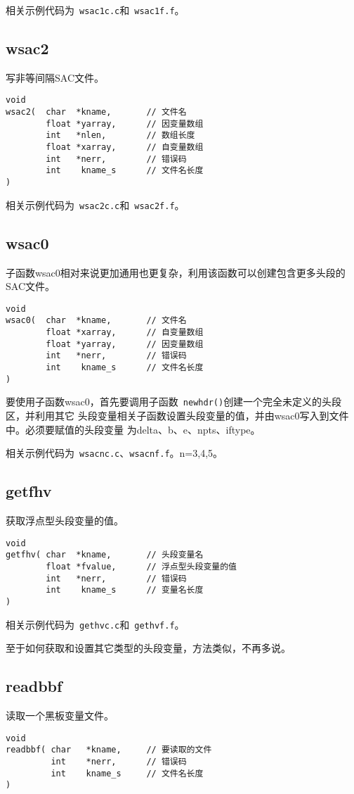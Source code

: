 相关示例代码为~\verb+wsac1c.c+和~\verb+wsac1f.f+。

\subsection{wsac2}
写非等间隔SAC文件。

\begin{verbatim}
void
wsac2(  char  *kname,       // 文件名
        float *yarray,      // 因变量数组
        int   *nlen,        // 数组长度
        float *xarray,      // 自变量数组
        int   *nerr,        // 错误码
        int    kname_s      // 文件名长度
)
\end{verbatim}

相关示例代码为~\verb+wsac2c.c+和~\verb+wsac2f.f+。

\subsection{wsac0}
子函数wsac0相对来说更加通用也更复杂，利用该函数可以创建包含更多头段的SAC文件。

\begin{verbatim}
void
wsac0(  char  *kname,       // 文件名
        float *xarray,      // 自变量数组
        float *yarray,      // 因变量数组
        int   *nerr,        // 错误码
        int    kname_s      // 文件名长度
)
\end{verbatim}

要使用子函数wsac0，首先要调用子函数~\verb+newhdr()+创建一个完全未定义的头段区，并利用其它
头段变量相关子函数设置头段变量的值，并由wsac0写入到文件中。必须要赋值的头段变量
为delta、b、e、npts、iftype。

相关示例代码为~\verb+wsacnc.c+、\verb+wsacnf.f+。n=3,4,5。

\subsection{getfhv}
获取浮点型头段变量的值。
\begin{verbatim}
void
getfhv( char  *kname,       // 头段变量名
        float *fvalue,      // 浮点型头段变量的值
        int   *nerr,        // 错误码
        int    kname_s      // 变量名长度
)
\end{verbatim}

相关示例代码为~\verb+gethvc.c+和~\verb+gethvf.f+。

至于如何获取和设置其它类型的头段变量，方法类似，不再多说。

\subsection{readbbf}
读取一个黑板变量文件。
\begin{verbatim}
void
readbbf( char   *kname,     // 要读取的文件
         int    *nerr,      // 错误码
         int    kname_s     // 文件名长度
)
\end{verbatim}

